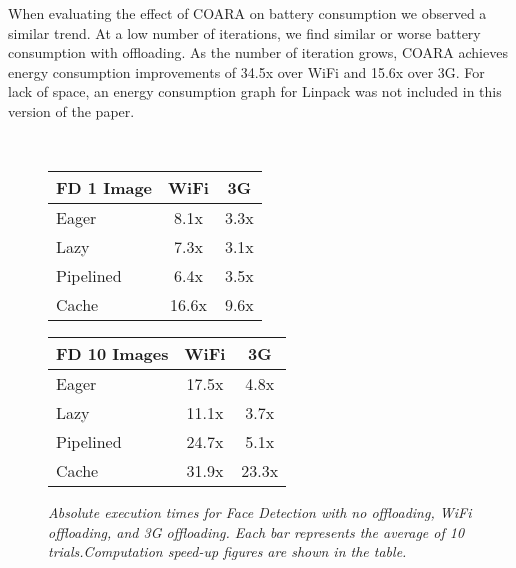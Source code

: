 \documentclass[10pt,journal,cspaper,compsoc]{IEEEtran}
\begin{document}
{When evaluating the effect of COARA on battery consumption we observed a similar trend. At a low number of iterations, we find similar or worse battery consumption with offloading. As the number of iteration grows, COARA achieves energy consumption improvements of 34.5x over WiFi and 15.6x over 3G.  For lack of space, an energy consumption graph for Linpack was not included in this version of the paper.

\begin{figure*}
\centering
{}
\\
\begin{tabular}{|l|c|c|} \hline
\textbf{FD 1 Image}&\textbf{WiFi}&\textbf{3G}\\ \hline
Eager &8.1x &3.3x\\ \hline
Lazy  &7.3x &3.1x\\ \hline
Pipelined &6.4x &3.5x\\ \hline
Cache &16.6x  &9.6x\\
\hline\end{tabular}
\hspace{8 mm}
\begin{tabular}{|l|c|c|} \hline
\textbf{FD 10 Images}&\textbf{WiFi}&\textbf{3G}\\ \hline
Eager &17.5x  &4.8x\\ \hline
Lazy  &11.1x  &3.7x\\ \hline
Pipelined &24.7x  &5.1x\\ \hline
Cache &31.9x  &23.3x\\
\hline\end{tabular}
\vspace{2 mm}
\caption{\small\textsl{Absolute execution times for Face Detection with no offloading, WiFi offloading, and 3G offloading. Each bar represents the average of 10 trials.Computation speed-up figures are shown in the table.}}
\label{fig:fd_performance}
\end{figure*}

}
\end{document}

